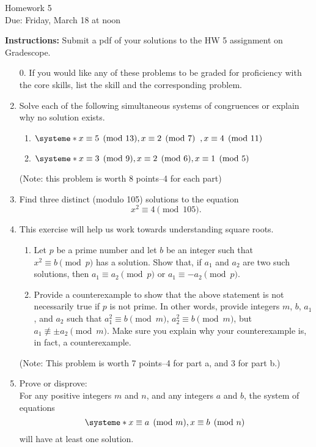 \documentclass[12pt]{article}
\begin{document}
\begin{center}
{\Large Homework 5}\\
Due: Friday,  March 18 at noon\\


\end{center}
{\bf Instructions:} Submit a pdf of your solutions to the HW 5 assignment on Gradescope. 



\begin{enumerate}
\item[0.] If you would like any of these problems to be graded for proficiency with the core skills, list the skill and the corresponding problem. 
\item Solve each of the following simultaneous systems of congruences or explain
why no solution exists.
\begin{enumerate}
\item $\systeme*{x\equiv 5\pmod{13}, x\equiv 2\pmod{7}\;\;, x\equiv 4 \pmod{11}}$
\item $\systeme*{x\equiv 3\pmod{9}, x\equiv 2\pmod 6, x\equiv 1\pmod{5}}$
\end{enumerate}
(Note: this problem is worth 8 points--4 for each part)
   
\item Find three distinct (modulo 105) solutions to the equation $$x^2\equiv 4\pmod{105}.$$
\item This exercise will help us work towards understanding square roots. 
\begin{enumerate}
\item Let $p$ be a prime number and let $b$ be an integer such that $x^2\equiv b\pmod{p}$ has a solution.  Show that,  if $a_1$ and $a_2$ are two such solutions, then $a_1\equiv a_2\pmod{p}$ or $a_1\equiv -a_2\pmod{p}$. 
\item Provide a counterexample to show that the above statement is not necessarily true if $p$ is not prime. In other words, provide integers $m$, $b$, $a_1$, and $a_2$ such that $a_1^2\equiv b\pmod{m}$, $a_2^2\equiv b\pmod{m}$, but $a_1\not \equiv \pm a_2 \pmod{m}$. Make sure you explain why your counterexample is, in fact, a counterexample. 
\end{enumerate}
(Note: This problem is worth 7 points--4 for part a, and 3 for part b.)
\item Prove or disprove:\\ For any positive integers $m$ and $n$,  and any integers $a$ and $b$, the system of equations $$\systeme*{x\equiv a\pmod{m},  x\equiv b\pmod{n}\;}$$
  will have at least one solution. 
\end{enumerate}
\end{document}
